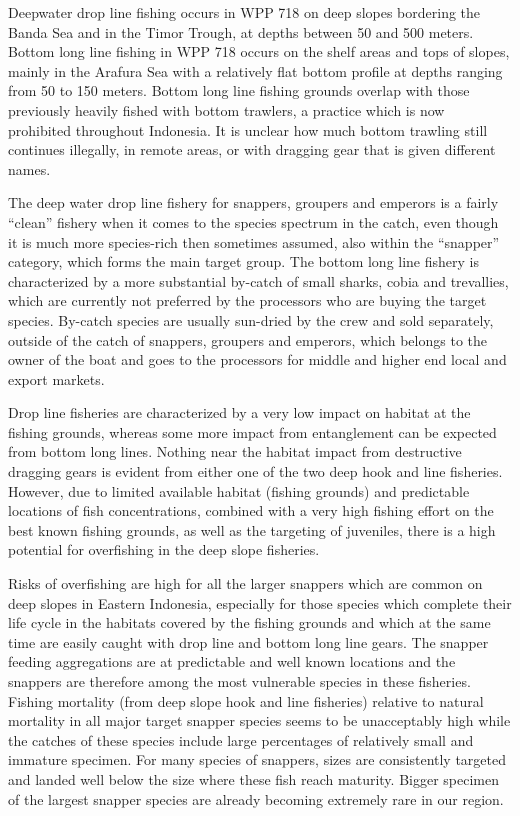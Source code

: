 Deepwater drop line fishing occurs in WPP 718 on deep slopes bordering the Banda Sea and in the Timor Trough, at depths between 50 and 500 meters. Bottom long line fishing in WPP 718 occurs on the shelf areas and tops of slopes, mainly in the Arafura Sea with a relatively flat bottom profile at depths ranging from 50 to 150 meters. Bottom long line fishing grounds overlap with those previously heavily fished with bottom trawlers, a practice which is now prohibited throughout Indonesia. It is unclear how much bottom trawling still continues illegally, in remote areas, or with dragging gear that is given different names.

The deep water drop line fishery for snappers, groupers and emperors is a fairly ``clean'' fishery when it comes to the species spectrum in the catch, even though it is much more species-rich then sometimes assumed, also within the ``snapper'' category, which forms the main target group. The bottom long line fishery is characterized by a more substantial by-catch of small sharks, cobia and trevallies, which are currently not preferred by the processors who are buying the target species. By-catch species are usually sun-dried by the crew and sold separately, outside of the catch of snappers, groupers and emperors, which belongs to the owner of the boat and goes to the processors for middle and higher end local and export markets.

Drop line fisheries are characterized by a very low impact on habitat at the fishing grounds, whereas some more impact from entanglement can be expected from bottom long lines. Nothing near the habitat impact from destructive dragging gears is evident from either one of the two deep hook and line fisheries. However, due to limited available habitat (fishing grounds) and predictable locations of fish concentrations, combined with a very high fishing effort on the best known fishing grounds, as well as the targeting of juveniles, there is a high potential for overfishing in the deep slope fisheries.
 
Risks of overfishing are high for all the larger snappers which are common on deep slopes in Eastern Indonesia, especially for those species which complete their life cycle in the habitats covered by the fishing grounds and which at the same time are easily caught with drop line and bottom long line gears. The snapper feeding aggregations are at predictable and well known locations and the snappers are therefore among the most vulnerable species in these fisheries. Fishing mortality (from deep slope hook and line fisheries) relative to natural mortality in all major target snapper species seems to be unacceptably high while the catches of these species include large percentages of relatively small and immature specimen. For many species of snappers, sizes are consistently targeted and landed well below the size where these fish reach maturity. Bigger specimen of the largest snapper species are already becoming extremely rare in our region.

